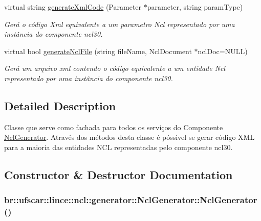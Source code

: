 \begin{DoxyCompactItemize}
virtual string \hyperlink{classbr_1_1ufscar_1_1lince_1_1ncl_1_1generator_1_1NclGenerator_a2306a011f81b11d0353644bf6bdf3e2b}{generateXmlCode} (Parameter $\ast$parameter, string paramType)
\begin{DoxyCompactList}\small\item\em Gerá o código Xml equivalente a um parametro Ncl representado por uma instância do componente ncl30. \item\end{DoxyCompactList}\item 
virtual bool \hyperlink{classbr_1_1ufscar_1_1lince_1_1ncl_1_1generator_1_1NclGenerator_a2817848f6498deda5d5e22cf784907a0}{generateNclFile} (string fileName, NclDocument $\ast$nclDoc=NULL)
\begin{DoxyCompactList}\small\item\em Gerá um arquivo xml contendo o código equivalente a um entidade Ncl representado por uma instância do componente ncl30. \item\end{DoxyCompactList}\end{DoxyCompactItemize}


\subsection{Detailed Description}
Classe que serve como fachada para todos os serviços do Componente \hyperlink{classbr_1_1ufscar_1_1lince_1_1ncl_1_1generator_1_1NclGenerator}{NclGenerator}. Através dos métodos desta classe é póssivel se gerar código XML para a maioria das entidades NCL representadas pelo componente ncl30. 

\subsection{Constructor \& Destructor Documentation}
\hypertarget{classbr_1_1ufscar_1_1lince_1_1ncl_1_1generator_1_1NclGenerator_a364caf2d15d48ca7f2d903a514134542}{
\subsubsection[{NclGenerator}]{\setlength{\rightskip}{0pt plus 5cm}br::ufscar::lince::ncl::generator::NclGenerator::NclGenerator ()}}
\label{classbr_1_1ufscar_1_1lince_1_1ncl_1_1generator_1_1NclGenerator_a364caf2d15d48ca7f2d903a514134542}


